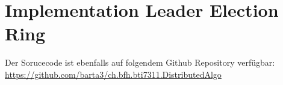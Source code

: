\chapter{Implementation Leader Election Ring}
\label{chap:app_leaderElection}

Der Sorucecode ist ebenfalls auf folgendem Github Repository verfügbar:\\
\url{https://github.com/barta3/ch.bfh.bti7311.DistributedAlgo}



\newpage

\newpage

